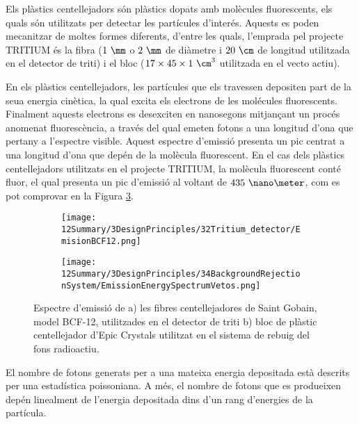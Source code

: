 Els plàstics centellejadors són plàstics dopats amb molècules fluorescents, els quals són utilitzats per detectar les partícules d'interés. Aquests es poden mecanitzar de moltes formes diferents, d'entre les quals, l'emprada pel projecte TRITIUM és la fibra ($1~\mm$ o $2~\mm$ de diàmetre i $20~\cm$ de longitud utilitzada en el detector de triti) i el bloc ($17\times 45 \times 1 ~\cm^3$ utilitzada en el vecto actiu). 

En els plàstics centellejadors, les partícules que els travessen depositen part de la seua energia cinètica, la qual excita els electrons de les molécules fluorescents. Finalment aquests electrons es desexciten en nanosegons mitjançant un procés anomenat fluorescència, a través del qual emeten fotons a una longitud d'ona que pertany a l'espectre visible. Aquest espectre d'emissió presenta un pic centrat a una longitud d'ona que depén de la molècula fluorescent. En el cas dels plàstics centellejadors utilitzats en el projecte TRITIUM, la molècula fluorescent conté fluor, el qual presenta un pic d'emissió al voltant de $435~\nano\meter$, com es pot comprovar en la Figura \ref{fig:EspectreEmisioPlasticsTRITIUM}.
\begin{figure}
\centering
    \begin{subfigure}[b]{0.7\textwidth}
    \centering
    \texttt{[image: 12Summary/3DesignPrinciples/32Tritium\_detector/EmisionBCF12.png]}  
        \caption{}\label{subfig:EspectreEmisioFibres}
    \end{subfigure}
    \hfill
    \begin{subfigure}[b]{0.7\textwidth}
    \centering
    \texttt{[image: 12Summary/3DesignPrinciples/34BackgroundRejectionSystem/EmissionEnergySpectrumVetos.png]}  
    \caption{\label{subfig:EspectreEmisioVeto}}
    \end{subfigure}
\caption{Espectre d'emissió de a) les fibres centellejadores de Saint Gobain, model BCF-12, utilitzades en el detector de triti \cite{DataSheetBCF12Fiber} b) bloc de plàstic centellejador d'Epic Crystals utilitzat en el sistema de rebuig del fons radioactiu\cite{ScintillatorVeto}\label{fig:EspectreEmisioPlasticsTRITIUM}.}
\end{figure}
El nombre de fotons generats per a una mateixa energia depositada està descrits per una estadística poissoniana. A més, el nombre de fotons que es produeixen depén linealment de l'energia depositada dins d'un rang d'energies de la partícula.

